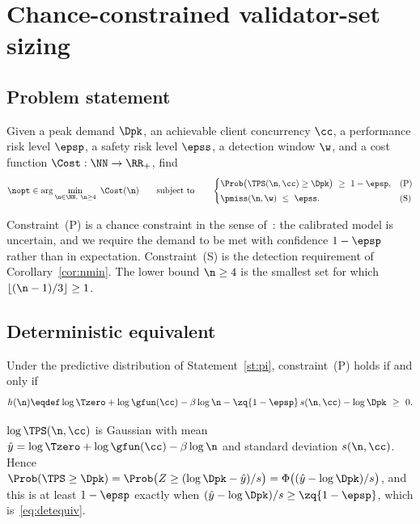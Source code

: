\section{Chance-constrained validator-set sizing}
\label{sec:sizing}

\subsection{Problem statement}

\begin{Problem}
\label{prob:sizing}
Given a peak demand $\Dpk$, an achievable client concurrency $\cc$, a
performance risk level $\epsp$, a safety risk level $\epss$, a detection window
$\w$, and a cost function $\Cost:\NN\to\RR_{+}$, find
\begin{equation}
\nopt\in\arg\min_{\n\in\NN,\ \n\ge4}\ \Cost(\n)
\qquad\text{subject to}\qquad
\begin{cases}
\Prob\bigl(\TPS(\n,\cc)\ge\Dpk\bigr)\ \ge\ 1-\epsp, & \text{(P)}\\[0.6ex]
\pmiss(\n,\w)\ \le\ \epss. & \text{(S)}
\end{cases}
\label{eq:sizing}
\end{equation}
\end{Problem}

Constraint~(P) is a chance constraint in the sense
of~\cite{charnes1959}: the calibrated model is uncertain, and we require the
demand to be met with confidence $1-\epsp$ rather than in expectation.
Constraint~(S) is the detection requirement of
Corollary~\ref{cor:nmin}. The lower bound $\n\ge4$ is the smallest set for
which $\lfloor(\n-1)/3\rfloor\ge1$.

\subsection{Deterministic equivalent}

\begin{Lemma}
\label{lem:detequiv}
Under the predictive distribution of Statement~\ref{st:pi},
constraint~(P) holds if and only if
\begin{equation}
h(\n)\eqdef\log\Tzero+\log\gfun(\cc)-\beta\log\n
-\zq{1-\epsp}\,s(\n,\cc)-\log\Dpk\ \ge\ 0 .
\label{eq:detequiv}
\end{equation}
\end{Lemma}

\begin{Proof}
$\log\TPS(\n,\cc)$ is Gaussian with mean $\hat y=\log\Tzero+\log\gfun(\cc)
-\beta\log\n$ and standard deviation $s(\n,\cc)$. Hence
$\Prob(\TPS\ge\Dpk)=\Prob\bigl(Z\ge(\log\Dpk-\hat y)/s\bigr)
=\Phi\bigl((\hat y-\log\Dpk)/s\bigr)$, and this is at least $1-\epsp$
exactly when $(\hat y-\log\Dpk)/s\ge\zq{1-\epsp}$, which
is~\eqref{eq:detequiv}.
\end{Proof}


